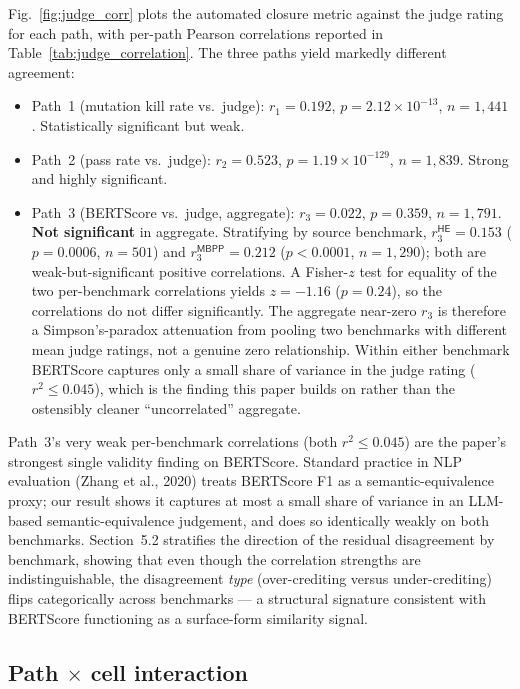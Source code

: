 

Fig.~\ref{fig:judge_corr} plots the automated closure metric against the judge rating for each path, with per-path Pearson correlations reported in Table~\ref{tab:judge_correlation}. The three paths yield markedly different agreement:

\begin{itemize}
  \item Path~1 (mutation kill rate vs.\ judge): $r_1 = 0.192$, $p = 2.12 \times 10^{-13}$, $n = 1{,}441$. Statistically significant but weak.
  \item Path~2 (pass rate vs.\ judge): $r_2 = 0.523$, $p = 1.19 \times 10^{-129}$, $n = 1{,}839$. Strong and highly significant.
  \item Path~3 (BERTScore vs.\ judge, aggregate): $r_3 = 0.022$, $p = 0.359$, $n = 1{,}791$. \textbf{Not significant} in aggregate. Stratifying by source benchmark, $r_3^{\textsf{HE}} = 0.153$ ($p = 0.0006$, $n = 501$) and $r_3^{\textsf{MBPP}} = 0.212$ ($p < 0.0001$, $n = 1{,}290$); both are weak-but-significant positive correlations. A Fisher-$z$ test for equality of the two per-benchmark correlations yields $z = -1.16$ ($p = 0.24$), so the correlations do not differ significantly. The aggregate near-zero $r_3$ is therefore a Simpson's-paradox attenuation from pooling two benchmarks with different mean judge ratings, not a genuine zero relationship. Within either benchmark BERTScore captures only a small share of variance in the judge rating ($r^2 \leq 0.045$), which is the finding this paper builds on rather than the ostensibly cleaner ``uncorrelated'' aggregate.
\end{itemize}

Path~3's very weak per-benchmark correlations (both $r^2 \leq 0.045$) are the paper's strongest single validity finding on BERTScore. Standard practice in NLP evaluation (Zhang et al., 2020) treats BERTScore F1 as a semantic-equivalence proxy; our result shows it captures at most a small share of variance in an LLM-based semantic-equivalence judgement, and does so identically weakly on both benchmarks. Section~5.2 stratifies the direction of the residual disagreement by benchmark, showing that even though the correlation strengths are indistinguishable, the disagreement \emph{type} (over-crediting versus under-crediting) flips categorically across benchmarks --- a structural signature consistent with BERTScore functioning as a surface-form similarity signal.

\subsection{Path $\times$ cell interaction}

